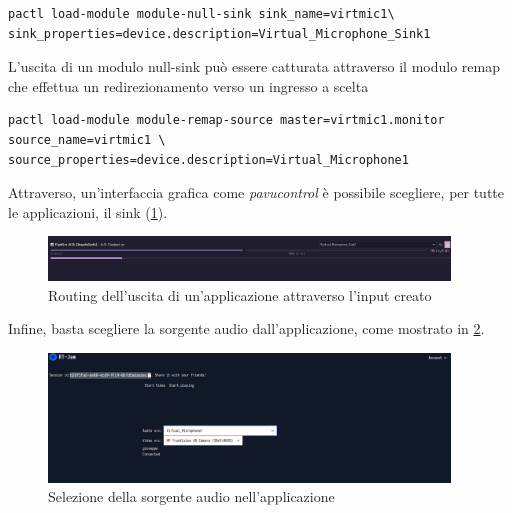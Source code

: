 \documentclass{article}
\begin{document}
\begin{verbatim}
pactl load-module module-null-sink sink_name=virtmic1\ 
sink_properties=device.description=Virtual_Microphone_Sink1
\end{verbatim}

L'uscita di un modulo null-sink può essere catturata attraverso il modulo remap che effettua un redirezionamento verso un ingresso a scelta
\begin{verbatim}
pactl load-module module-remap-source master=virtmic1.monitor source_name=virtmic1 \ 
source_properties=device.description=Virtual_Microphone1
\end{verbatim}

Attraverso, un'interfaccia grafica come \textit{pavucontrol} è possibile scegliere, per 
tutte le applicazioni, il sink (\cref{fig:routing-sink}).
\begin{figure}[h]
  \begin{center}
    \includegraphics[width=0.95\textwidth]{../figures/selecting_sink.png}
  \end{center}
  \caption{Routing dell'uscita di un'applicazione attraverso l'input creato}\label{fig:routing-sink}
\end{figure}

Infine, basta scegliere la sorgente audio dall'applicazione, come mostrato in \cref{fig:selecting-vmic}.

\begin{figure}
  \begin{center}
    \includegraphics[width=0.95\textwidth]{../figures/selecting_vmic.png}
  \end{center}
  \caption{Selezione della sorgente audio nell'applicazione}\label{fig:selecting-vmic}
\end{figure}

\clearpage




\end{document}
